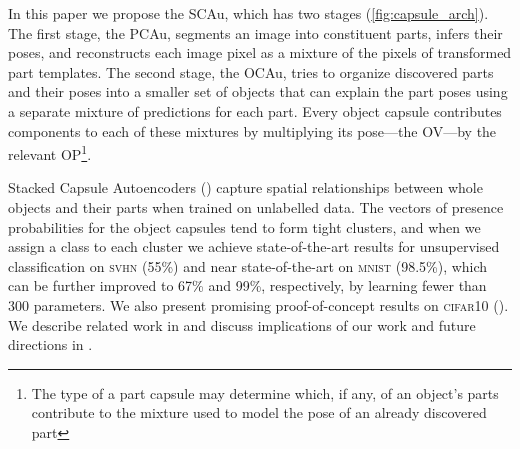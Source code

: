 In this paper we propose the \gls{SCAu}, which has two stages (\cref{fig:capsule_arch}). The first stage, the \gls{PCAu}, segments an image into constituent parts, infers their poses, and reconstructs each image pixel as a mixture of the pixels of transformed part templates.
The second stage, the \gls{OCAu}, tries to organize discovered parts and their poses into a smaller set of objects that can explain the part poses using a separate mixture of predictions for each part. 
Every object capsule contributes components to each of these mixtures by multiplying its pose---the \gls{OV}---by the relevant \gls{OP}\footnote{The type of a part capsule may determine which, if any, of an object's parts contribute to the mixture used to model the pose of an already discovered part}.

Stacked Capsule Autoencoders () capture spatial relationships between whole objects and their parts when trained on unlabelled data.
The vectors of presence probabilities for the object capsules tend to form tight clusters, and when we assign a class to each cluster we achieve state-of-the-art results for unsupervised classification on \textsc{svhn} (55\%) and near state-of-the-art on \textsc{mnist} (98.5\%), which can be further improved to 67\% and 99\%, respectively, by learning fewer than 300 parameters. We also present promising proof-of-concept results on \textsc{cifar10} ().
%
We describe related work in  and discuss implications of our work and future  directions in .

